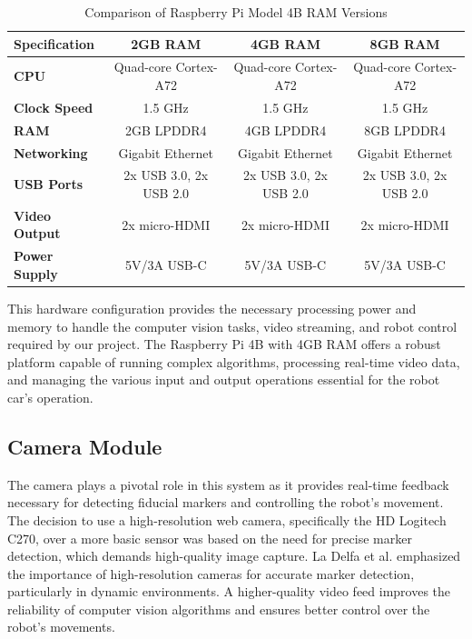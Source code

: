 \begin{table}[h!]
	\centering
	\begin{tabular}{|l|c|c|c|}
		\hline
		\textbf{Specification} & \textbf{2GB RAM} & \textbf{4GB RAM} & \textbf{8GB RAM} \\
		\hline
		\textbf{CPU} & Quad-core Cortex-A72 & Quad-core Cortex-A72 & Quad-core Cortex-A72 \\
		\hline
		\textbf{Clock Speed} & 1.5 GHz & 1.5 GHz & 1.5 GHz \\
		\hline
		\textbf{RAM} & 2GB LPDDR4 & 4GB LPDDR4 & 8GB LPDDR4 \\
		\hline
		\textbf{Networking} & Gigabit Ethernet & Gigabit Ethernet & Gigabit Ethernet \\
		\hline
		\textbf{USB Ports} & 2x USB 3.0, 2x USB 2.0 & 2x USB 3.0, 2x USB 2.0 & 2x USB 3.0, 2x USB 2.0 \\
		\hline
		\textbf{Video Output} & 2x micro-HDMI & 2x micro-HDMI & 2x micro-HDMI \\
		\hline
		\textbf{Power Supply} & 5V/3A USB-C & 5V/3A USB-C & 5V/3A USB-C \\
		\hline
	\end{tabular}
	\caption{Comparison of Raspberry Pi Model 4B RAM Versions}
	\label{table:pi_specs}
\end{table}

This hardware configuration provides the necessary processing power and memory to handle the computer vision tasks, video streaming, and robot control required by our project. The Raspberry Pi 4B with 4GB RAM offers a robust platform capable of running complex algorithms, processing real-time video data, and managing the various input and output operations essential for the robot car's operation.

\subsection{Camera Module}
The camera plays a pivotal role in this system as it provides real-time feedback necessary for detecting fiducial markers and controlling the robot's movement. The decision to use a high-resolution web camera, specifically the HD Logitech C270, over a more basic sensor was based on the need for precise marker detection, which demands high-quality image capture. La Delfa et al. \cite{delfa2015} emphasized the importance of high-resolution cameras for accurate marker detection, particularly in dynamic environments. A higher-quality video feed improves the reliability of computer vision algorithms and ensures better control over the robot’s movements.

